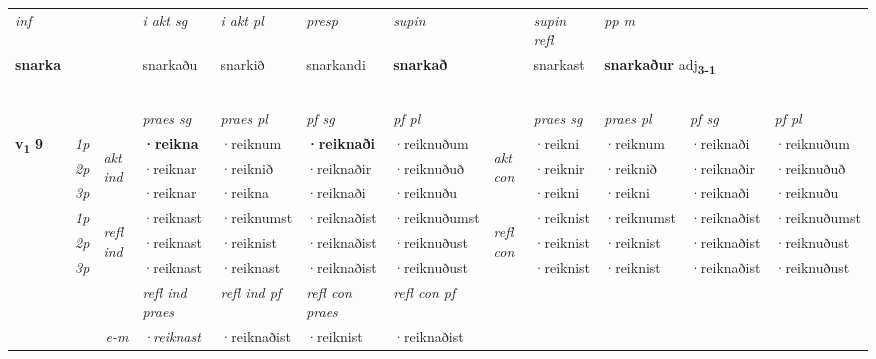 \begin{longtable}[l]{X>{\footnotesize\itshape}llXXXXlXXXX}
\cmidrule{4-7}
   {\textit{inf}} & &  & \textit{i akt sg} & \textit{i akt pl}   & \textit{presp} & \textit{supin} && \textit{supin refl} & \textit{pp m} \\*
  {\textbf{snarka}} & && snarkaðu  & snarkið   & snarkandi &  \textbf{snarkað} && snarkast & \multicolumn{2}{l}{\textbf{snarkaður} adj\textbf{\textsubscript{3-1}}} \\*
 \midrule
& \\*
 & \\*
  & \\*
   & \\*
  & \\
   \midrule
 & &   & \textit{praes sg}  & \textit{praes pl}    & \textit{ pf sg} & \textit{pf pl} & & \textit{praes sg}  & \textit{praes pl}    & \textit{pf sg} & \textit{pf pl }  \\ \cmidrule{4-7} \cmidrule{9-12}
 \multirow{2}{*}{{{\textbf{v{\textsubscript{1}}} \Large{\textbf{9}}}}}  & 1p & \multirow{3}{*}{\begin{turn}{90}\textit{akt ind}\end{turn}} & \textbf{·reikna} & ·reiknum & \textbf{·reiknaði} & ·reiknuðum & \multirow{3}{*}{\begin{turn}{90}\textit{akt con}\end{turn}} &·reikni & ·reiknum & ·reiknaði & ·reiknuðum\\*
 & 2p &  &  ·reiknar  & ·reiknið & ·reiknaðir & ·reiknuðuð & & ·reiknir & ·reiknið & ·reiknaðir & ·reiknuðuð \\*
 & 3p &  & ·reiknar & ·reikna & ·reiknaði & ·reiknuðu & & ·reikni & ·reikni& ·reiknaði & ·reiknuðu \\*
\cmidrule{4-7} \cmidrule{9-12}
 & 1p & \multirow{3}{*}{\begin{turn}{90}\textit{refl ind}\end{turn}}  & ·reiknast & ·reiknumst & ·reiknaðist & ·reiknuðumst & \multirow{3}{*}{\begin{turn}{90}\textit{refl con}\end{turn}}  &·reiknist & ·reiknumst & ·reiknaðist & ·reiknuðumst \\*
 & 2p &  & ·reiknast & ·reiknist & ·reiknaðist & ·reiknuðust & &·reiknist & ·reiknist & ·reiknaðist & ·reiknuðust \\*
 & 3p  & & ·reiknast & ·reiknast & ·reiknaðist & ·reiknuðust & & ·reiknist & ·reiknist& ·reiknaðist & ·reiknuðust \\*
\cmidrule{4-7} \cmidrule{9-12}

 & && \textit{refl ind praes} & \textit{refl ind pf} & \textit{refl con praes} & \textit{refl con pf} \\*
\multicolumn{3}{r}{\textit{e-m}}& ·reiknast & ·reiknaðist & ·reiknist & ·reiknaðist \\*


\end{longtable}
